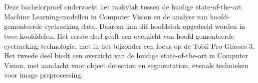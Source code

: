 \chapter{}%
\label{ch:stand-van-zaken}





Deze bachelorproef onderzoekt het raakvlak tussen de huidige state-of-the-art Machine Learning-modellen in Computer Vision en de analyse van hoofd-gemonteerde eyetracking data.
Daarom kan dit hoofdstuk opgedeeld worden in twee hoofddelen. Het eerste deel geeft een overzicht van hoofd-gemonteerde eyetracking technologie, met in het bijzonder een focus op de Tobii Pro Glasses 3.
Het tweede deel biedt een overzicht van de huidige state-of-the-art in Computer Vision, met aandacht voor object detection en segmentation, evenals technieken voor image preprocessing.

